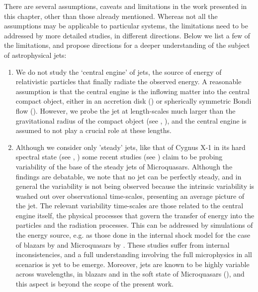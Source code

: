 There are several assumptions, caveats and limitations in the work presented in this chapter, other than those already mentioned. Whereas not all the assumptions may be applicable to particular systems, the limitations need to be addressed by more detailed studies, in different directions. Below we list a few of the limitations, and propose directions for a deeper understanding of the subject of astrophysical jets:

\begin{enumerate}

\item We do not study the `central engine' of jets, the source of energy of relativistic particles that finally radiate the observed energy. A reasonable assumption is that the central engine is the inflowing matter into the central compact object, either in an accretion disk (\citealt{Shakura_&_Sunayev-1973-AAp}) or spherically symmetric Bondi flow (\citealt{Bondi-1952-MNRAS}). However, we probe the jet at length-scales much larger than the gravitational radius of the compact object (see \citealt{Zdziarski-2012-MNRAS-Radio_modulation_CX1}, \citealt{Zdziarski_et_al.-2012-MNRAS-MeV_tail_CX1}), and the central engine is assumed to not play a crucial role at these lengths.

\item Although we consider only 'steady' jets, like that of Cygnus X-1 in its hard spectral state (see \citealt{Stirling_et_al.-2001-MNRAS}, \citealt{Zdziarski-2012-MNRAS-Radio_modulation_CX1}) some recent studies (see \citealt{Gandhi_et_al.-2011-ApJ}) claim to be probing variability of the base of the steady jets of Microquasars. Although the findings are debatable, we note that no jet can be perfectly steady, and in general the variability is not being observed because the intrinsic variability is washed out over observational time-scales, presenting an average picture of the jet. The relevant variability time-scales are those related to the central engine itself, the physical processes that govern the transfer of energy into the particles and the radiation processes. This can be addressed by simulations of the energy source, e.g. as those done in the internal shock model for the case of blazars by \citealt{Joshi_&_Bottcher-2007-ApJ} and Microquasars by \citealt{Jamil_et_al.-2010-MNRAS}. These studies suffer from internal inconsistencies, and a full understanding involving the full microphysics in all scenarios is yet to be emerge. Moreover, jets are known to be highly variable across wavelengths, in blazars \citep{Kushwaha_et_al.-2013-MNRAS,Agarwal_et_al.-2015-MNRAS,Agarwal_et_al.-2016-MNRAS} and in the soft state of Microquasars (\citealt{Mirabel_&_Rodriguez-1994-Nature}), and this aspect is beyond the scope of the present work.


\end{enumerate}
